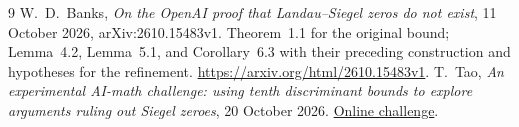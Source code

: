 \documentclass[11pt]{article}
\begin{document}
\begin{thebibliography}{9}
W.~D.~Banks,
\emph{On the OpenAI proof that Landau--Siegel zeros do not exist},
11 October 2026, arXiv:2610.15483v1. Theorem~1.1 for the original
bound; Lemma~4.2, Lemma~5.1, and Corollary~6.3 with their preceding
construction and hypotheses for the refinement.
\url{https://arxiv.org/html/2610.15483v1}.
T.~Tao,
\emph{An experimental AI-math challenge: using tenth discriminant
bounds to explore arguments ruling out Siegel zeroes},
20 October 2026.
\href{https://terrytao.wordpress.com/2026/10/20/an-experimental-ai-math-challenge-using-tenth-discriminant-bounds-to-explore-arguments-ruling-out-siegel-zeroes/}
{Online challenge}.
\end{thebibliography}
\end{document}
